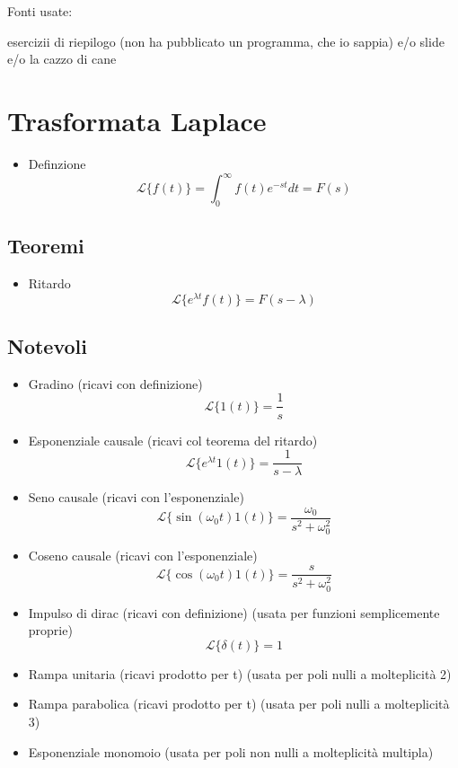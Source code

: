 \documentclass[11pt]{article}
\date{\today}
\title{}
\begin{document}
\tableofcontents

Fonti usate: 

esercizii di riepilogo (non ha pubblicato un programma, che io sappia)
e/o slide e/o la cazzo di cane

\section{Trasformata Laplace}
\label{sec:orgf05aa9c}
\begin{itemize}
\item Definzione
\[\mathcal{L}\{f(t)\} = \int_{0}^{\infty} f(t) e^{-st} dt = F(s)\]
\end{itemize}

\subsection{Teoremi}
\label{sec:org1018507}
\begin{itemize}
\item Ritardo
\[\mathcal{L}\{e^{\lambda t}f(t)\} = F(s-\lambda)\]
\end{itemize}

\subsection{Notevoli}
\label{sec:orge9fbadc}
\begin{itemize}
\item Gradino (ricavi con definizione)
\[ \mathcal{L}\{1(t)\} = \frac{1}{s} \]
\item Esponenziale causale (ricavi col teorema del ritardo)
\[ \mathcal{L}\{e^{\lambda t} 1(t)\} = \frac{1}{s- \lambda} \]
\item Seno causale (ricavi con l'esponenziale)
\[ \mathcal{L}\{\sin(\omega _0 t) 1(t)\} = \frac{\omega _0}{s^2 + \omega _0 ^2} \]
\item Coseno causale (ricavi con l'esponenziale)
\[ \mathcal{L}\{\cos(\omega _0 t) 1(t)\} = \frac{s}{s^2 + \omega _0 ^2} \]
\item Impulso di dirac (ricavi con definizione) (usata per funzioni semplicemente proprie)
\[ \mathcal{L}\{\delta (t)\} = 1 \]
\item Rampa unitaria (ricavi prodotto per t) (usata per poli nulli a molteplicità 2)
\item Rampa parabolica (ricavi prodotto per t) (usata per poli nulli a molteplicità 3)
\item Esponenziale \texttimes{} monomoio (usata per poli non nulli a molteplicità multipla)
\end{itemize}
\end{document}

